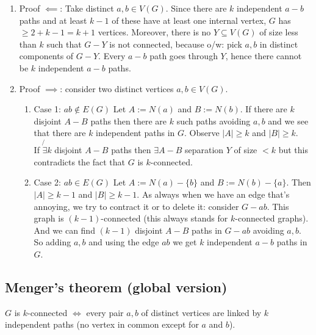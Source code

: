 		\begin{enumerate}
			\item Proof $\impliedby$: Take distinct $a ,b \in V(G)$. Since there are $k$ independent $a-b$ paths and at least $k-1$ of these have at least one internal vertex, $G$ has $\geq 2 + k - 1 = k + 1$ vertices. Moreover, there is no $Y \subseteq V(G)$ of size less than $k$ such that $G - Y$ is not connected, because o/w: pick $a,b$ in distinct components of $G - Y$. Every $a-b$ path goes through $Y$, hence there cannot be $k$ independent $a-b$ paths.
			\item Proof $\implies$: consider two distinct vertices $a,b \in V(G)$. 
		\begin{enumerate}
		\item{Case 1: $ab \notin E(G)$}
		Let $A := N(a)$ and $B := N(b)$.
		If there are $k$ disjoint $A-B$ paths then there are $k$ such paths avoiding $a,b$ and we see that there are $k$ independent paths in $G$.  Observe $|A| \geq k$ and $|B| \geq k$.\\
		
		If $\not{\exists} k$ disjoint $A-B$ paths then $\exists A-B$ separation $Y$ of size $< k$ but this contradicts the fact that $G$ is $k$-connected.
		
		\item{Case 2: $ab \in E(G)$}
		Let $A := N(a) - \{b\}$ and $B := N(b) - \{a\}$. Then $|A| \geq k -1$ and $|B| \geq k - 1$. As always when we have an edge that's annoying, we try to contract it or to delete it:  consider  $G - ab$. This graph is $(k-1)$-connected (this always stands for $k$-connected graphs). And we can find $(k-1)$ disjoint $A-B$ paths in $G - ab$ avoiding $a,b$. So adding $a,b$ and using the edge $ab$ we get $k$ independent $a-b$ paths in $G$. 
		\end{enumerate} 
		\end{enumerate}


\subsection{Menger's theorem (global version)}
$G$ is $k$-connected $\iff$ every pair $a,b$ of distinct vertices are linked by $k$ independent paths (no vertex in common except for $a$ and $b$).
